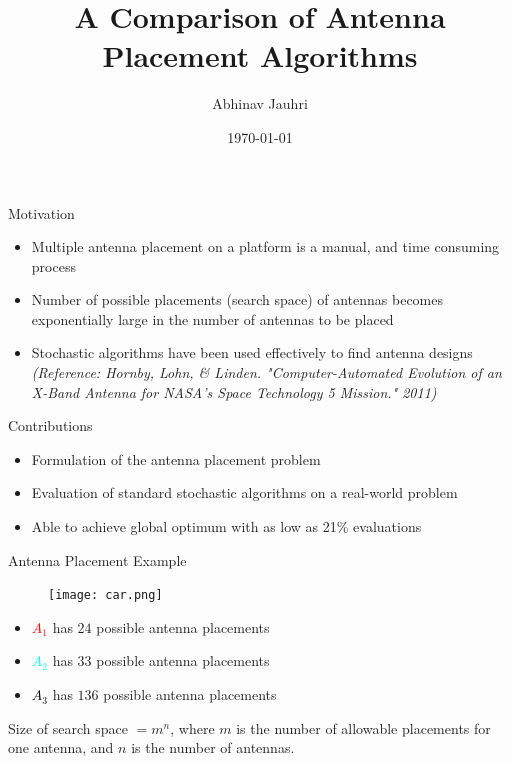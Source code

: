\documentclass{beamer}
\title{\color{univred} A Comparison of Antenna Placement Algorithms}
\author{Abhinav Jauhri}
\date{\today}
\begin{document}
    \begin{frame}
        \color{univred}
        \titlepage
    \end{frame}

    \begin{frame}[t]{Motivation}
        \begin{itemize}
            \item<1->Multiple antenna placement on a platform is a manual, and time consuming process
            \item<2->Number of possible placements (search space) of antennas becomes exponentially large in the number of antennas to be placed
            \item<3-> Stochastic algorithms have been used effectively to find antenna designs {\textit{\small (Reference: Hornby, Lohn, \& Linden. "Computer-Automated Evolution of an X-Band Antenna for NASA's Space Technology 5 Mission." 2011)}}
        \end{itemize}
        \vspace{5mm}
        \centering{}
    \end{frame}
 
    \begin{frame}[t]{Contributions}
        \begin{itemize}
            \item Formulation of the antenna placement problem
            \item Evaluation of standard stochastic algorithms on a real-world problem
            \item Able to achieve global optimum with as low as 21\% evaluations
        \end{itemize}
        \vspace{5mm}
    \end{frame}
   

    \begin{frame}[t]{Antenna Placement Example}
        \begin{figure}
            \centering
            \texttt{[image: car.png]}
        \end{figure}
        \begin{itemize}
            \item \textcolor{red}{$A_1$} has $24$ possible antenna placements
            \item \textcolor{cyan}{$A_2$} has $33$ possible antenna placements
            \item \textcolor{black}{$A_3$} has $136$ possible antenna placements
        \end{itemize}
        Size of search space $= m^n$, where $m$ is the number of allowable placements for one antenna, and $n$ is the number of antennas.
    \end{frame}
\end{document}
